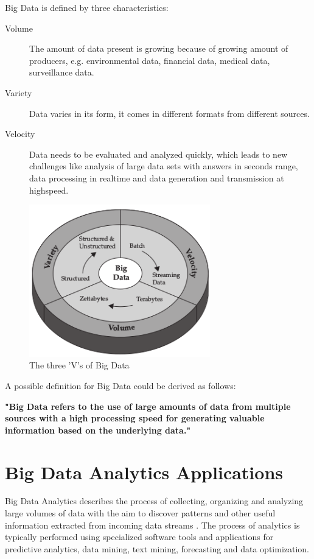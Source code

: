 Big Data is defined by three characteristics:\cite{Marz15}

\begin{description}
    \item [Volume] The amount of data present is growing because of growing amount of producers,
    e.g. environmental data, financial data, medical data, surveillance data.
    \item [Variety] Data varies in its form, it comes in different formats from different sources.
    \item [Velocity] Data needs to be evaluated and analyzed quickly, which leads to new challenges
    like analysis of large data sets with answers in seconds range, data processing in realtime
    and data generation and transmission at highspeed.
\end{description}


\begin{figure}[H]
	\centering
	\includegraphics[width=0.7\textwidth]{../images/03-three-vs-of-bigdata.png}
	\caption{The three 'V's of Big Data{\cite{Ziko12}}}
	\label{three-vs-of-bigdata}
\end{figure}

A possible definition for Big Data could be derived as follows:

\textbf{"Big Data refers to the use of large amounts of data from multiple sources with a high processing
speed for generating valuable information based on the underlying data."}

\section{Big Data Analytics Applications}

Big Data Analytics describes the process of collecting, organizing and analyzing large volumes
of data with the aim to discover patterns and other useful information extracted from incoming
data streams \cite{Marz15}. The process of analytics is typically performed using specialized software tools and
applications for predictive analytics, data mining, text mining, forecasting and data optimization.

